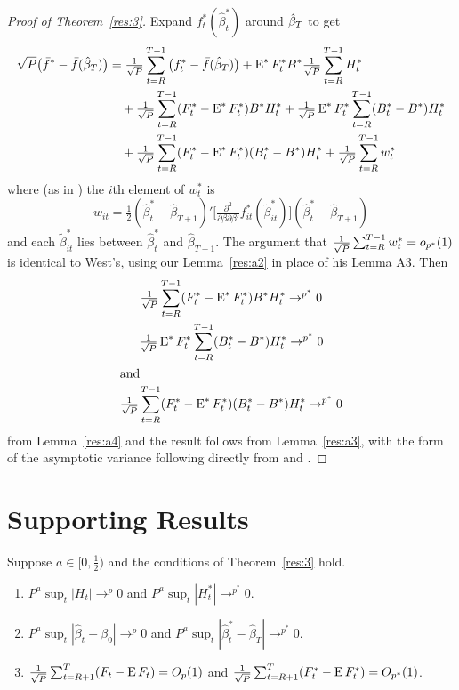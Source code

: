 \documentclass[12pt,fleqn]{article}
\begin{document}
\newcommand{\WesA}[1][]{\oclt{t}
  (F_t^{#1} - \E^{#1} F_t^{#1}) B^{#1} H_t^{#1}}
\newcommand{\WesB}[1][]{\tfrac{1}{\sqrt{P}} \E^{#1} F_t^{#1} \osum{t} (B_t^{#1} -
  B^{#1}) H_t^{#1}}
\newcommand{\WesC}[1][]{\oclt{t}
  (F_t^{#1} - \E^{#1} F_t^{#1}) (B_t^{#1} - B^{#1}) H_t^{#1}}
\begin{proof}[Proof of Theorem~\ref{res:3}]
  Expand $f_t^{*}(\hat{\beta}_t^{*})$ around $\btrue[*]$
  to get
  \begin{align*}
    \sqrt{P} \big(\bar{f}^{*} - \bar{f}(\btrue[*])\big) &= \oclt{t}
    \big(f_t^{*} - \bar{f}(\btrue[*])\big) +
    \E^* F_t^{*} B^{*} \oclt{t} H_t^* \\
    & \quad + \WesA[*] + \WesB[*] \\ & \quad + \WesC[*] + \oclt{t} w_t^*
  \end{align*}
  where (as in \citealp{Wes:96}) the $i$th element of $w_t^*$ is
  \begin{equation*}
    w_{it} = \tfrac12 (\hat\beta_t^* - \hat\beta_{T+1})'
    \Big[\tfrac{\partial^2}{\partial \beta \partial\beta'}
    f_{it}^*(\tilde\beta_{it}^*) \Big]
    (\hat\beta_t^* - \hat\beta_{T+1})
  \end{equation*}
  and each $\tilde\beta_{it}^*$ lies between $\hat\beta_t^*$ and
  $\hat\beta_{T+1}$.  The argument that $\tfrac{1}{\sqrt{P}} \sum_{t=R}^{T-1} w_t^* = o_{p^*}(1)$ is
  identical to West's, using our Lemma~\ref{res:a2} in place of his
  Lemma A3.  Then
  \begin{gather}
    \WesA[*] \to^{p^*} 0 \label{eq:7} \\
    \WesB[*] \to^{p^*} 0 \label{eq:9} \\
  \intertext{and}
    \WesC[*] \to^{p^*} 0 \label{eq:10}
  \end{gather}
  from Lemma~\ref{res:a4} and the result follows from
  Lemma~\ref{res:a3}, with the form of the asymptotic variance
  following directly from \citet{Wes:96} and \citet{WeM:98}.
\end{proof}

\section{Supporting Results}

\begin{lema}\label{res:a2}
  Suppose $a \in [0,\frac12)$ and the conditions of Theorem~\ref{res:3}
  hold.
  \begin{enumerate}
  \item $P^a \sup_t | H_{t} | \to^p 0$ and $P^a \sup_t | H_{t}^{*} |
    \to^{p^{*}} 0$.
  \item $P^a \sup_t | \hat{\beta}_{t} - \beta_{0} | \to^{p} 0$ and
    $P^a \sup_t | \hat{\beta}^{*}_{t} - \hat{\beta}_T |
    \to^{p^{*}} 0$.
  \item $\tfrac{1}{\sqrt{P}} \sum_{t=R+1}^T (F_t - \operatorname{E} F_t) = O_{p}(1)$
    and $\tfrac{1}{\sqrt{P}} \sum_{t=R+1}^T (F_t^* - \operatorname{E} F_t^*) =
    O_{p^*}(1)$.
  \end{enumerate}
\end{lema}
\end{document}
